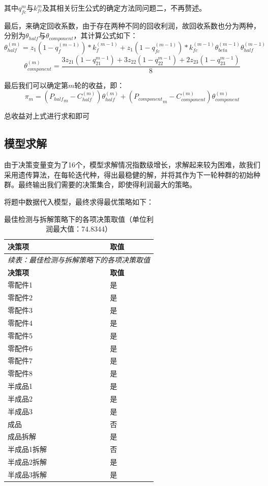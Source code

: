 \documentclass[withoutpreface,bwprint]{cumcmthesis}
\begin{document}
其中$q_{fc}^{m}$与$k_{fc}^{m}$及其相关衍生公式的确定方法同问题二，不再赘述。

最后，来确定回收系数，由于存在两种不同的回收利润，故回收系数也分为两种，分别为$\theta_{half}$与$\theta_{component}$，其计算公式如下：
\begin{equation}
\theta_{half}^{(m)}=z_1(1-q_f^{(m-1)})*k_f^{(m-1)}+z_1(1-q_{fc}^{(m-1)})*k_{fc}^{(m-1)}\theta_{beta}^{(m-1)}\theta_{half}^{(m-1)}
\end{equation}
\begin{equation}
\theta_{component}^{(m)}=\frac{3z_{21}(1-q_{21}^{m-1})+3z_{22}(1-q_{22}^{m-1})+2z_{23}(1-q_{23}^{m-1})}{8}
\end{equation}

最后我们可以确定第$m$轮的收益，即：
\begin{equation}  
\pi_m=({P_{half}}_{m}-C_{half}^{(m)})\theta_{half}^{(m)}+({P_{component}}_{m}-C_{component}^{(m)})\theta_{component}^{(m)}
\end{equation}

总收益对上式进行求和即可
\subsection{模型求解}
由于决策变量变为了16个，模型求解情况指数级增长，求解起来较为困难，故我们采用遗传算法，在每轮迭代种，得出最稳健的解，并将其作为下一轮种群的初始种群。最终输出我们需要的决策集合，即使得利润最大的策略。

将题中数据代入模型，最终求得最优策略如下：


\begin{longtable}{p{}p{}}
\caption{最佳检测与拆解策略下的各项决策取值（单位利润最大值：74.8344）} \\
\toprule
\textbf{决策项} & \textbf{取值} \\
\midrule
\endfirsthead

\multicolumn{2}{l}{\textit{续表：最佳检测与拆解策略下的各项决策取值}} \\
\toprule
\textbf{决策项} & \textbf{取值} \\
\midrule
\endhead

\bottomrule
\endfoot

零配件1       & 是 \\
零配件2       & 是 \\
零配件3       & 是 \\
零配件4       & 是 \\
零配件5       & 是 \\
零配件6       & 是 \\
零配件7       & 是 \\
零配件8       & 是 \\
半成品1       & 是 \\
半成品2       & 是 \\
半成品3       & 是 \\
成品          & 否 \\
成品拆解      & 是 \\
半成品1拆解   & 否 \\
半成品2拆解   & 是 \\
半成品3拆解   & 是 \\
\end{longtable}
\end{document}
